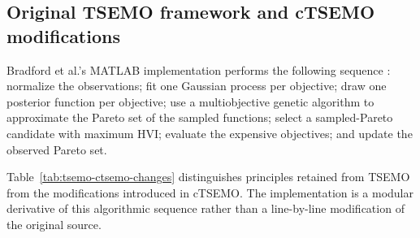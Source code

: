 \documentclass[twoside]{article}
\begin{document}
\subsection{Original TSEMO framework and cTSEMO modifications}

Bradford et al.'s MATLAB implementation performs the following sequence
\cite{bradford2018tsemo}: normalize the observations; fit one Gaussian
process per objective; draw one posterior function per objective; use a
multiobjective genetic algorithm to approximate the Pareto set of the sampled
functions; select a sampled-Pareto candidate with maximum HVI; evaluate the
expensive objectives; and update the observed Pareto set.

Table~\ref{tab:tsemo-ctsemo-changes} distinguishes principles retained from
TSEMO from the modifications introduced in cTSEMO. The implementation is a
modular derivative of this algorithmic sequence rather than a line-by-line
modification of the original source.
\end{document}

